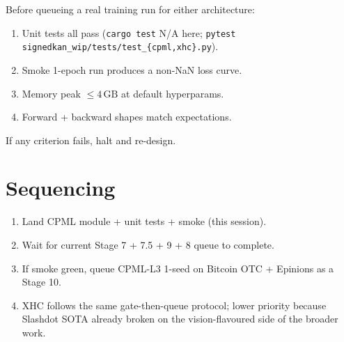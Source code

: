 \documentclass[10pt]{article}
\begin{document}
Before queueing a real training run for either architecture:
\begin{enumerate}
  \item Unit tests all pass (\texttt{cargo test} N/A here;
    \texttt{pytest signedkan\_wip/tests/test\_\{cpml,xhc\}.py}).
  \item Smoke 1-epoch run produces a non-NaN loss curve.
  \item Memory peak $\le 4\,\mathrm{GB}$ at default hyperparams.
  \item Forward + backward shapes match expectations.
\end{enumerate}

If any criterion fails, halt and re-design.

\section*{Sequencing}

\begin{enumerate}
  \item Land CPML module + unit tests + smoke (this session).
  \item Wait for current Stage 7 + 7.5 + 9 + 8 queue to complete.
  \item If smoke green, queue CPML-L3 1-seed on Bitcoin OTC + Epinions
    as a Stage 10.
  \item XHC follows the same gate-then-queue protocol; lower priority
    because Slashdot SOTA already broken on the vision-flavoured side
    of the broader work.
\end{enumerate}
\end{document}

